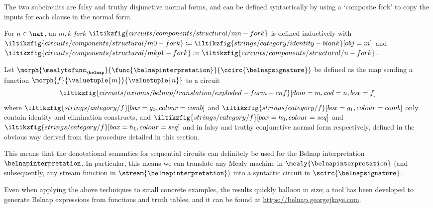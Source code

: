 The two subcircuits are falsy and truthy disjunctive normal forms, and can be
defined syntactically by using a `composite fork' to copy the inputs for each
clause in the normal form.

\begin{definition}\label{def:mk-fork}
    For \(n \in \nat\), an \emph{\(m,k\)-fork}
    \(\iltikzfig{circuits/components/structural/mn-fork}\)
    is defined
    inductively with \(
    \iltikzfig{circuits/components/structural/m0-fork} \coloneqq
    \iltikzfig{strings/category/identity-blank}[obj=m]
    \) and \(
    \iltikzfig{circuits/components/structural/mkp1-fork} \coloneqq
    \iltikzfig{circuits/components/structural/n-fork}
    \).
\end{definition}

\begin{definition}
    Let \(\morph{\mealytofunc_\belnap}{\func{\belnapinterpretation}}{\ccirc{\belnapsignature}}\)
    be defined as the map sending a function \(\morph{f}{\valuetuple{m}}{\valuetuple{n}}\)
    to a circuit \[
        \iltikzfig{circuits/axioms/belnap/translation/exploded-form-cnf}[dom=m,cod=n,box=f]
    \] where \(
    \iltikzfig{strings/category/f}[box=g_0,colour=comb]
    \) and \(
    \iltikzfig{strings/category/f}[box=g_1,colour=comb]
    \) only contain identity and elimination constructs, and \(
    \iltikzfig{strings/category/f}[box=h_0,colour=seq]
    \) and \(
    \iltikzfig{strings/category/f}[box=h_1,colour=seq]
    \) and in falsy and truthy conjunctive normal form respectively, defined
    in the obvious way derived from the procedure detailed in this section.
\end{definition}

This means that the denotational semantics for sequential circuits can
definitely be used for the Belnap interpretation \(\belnapinterpretation\).
In particular, this means we can translate any Mealy machine in
\(\mealy{\belnapinterpretation}\) (and subsequently, any stream function in
\(\stream{\belnapinterpretation})\) into a syntactic circuit in
\(\scirc{\belnapsignature}\).

Even when applying the above techniques to small concrete examples,
the results quickly balloon in size; a tool has been developed to generate
Belnap expressions from functions and truth tables, and it can be found at
\url{https://belnap.georgejkaye.com}.